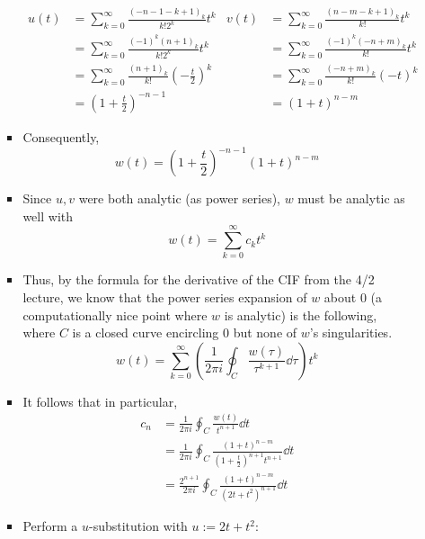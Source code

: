 \documentclass[../finalProject.tex]{subfiles}
\begin{document}
\begin{itemize}
\begin{itemize}
\begin{itemize}
            \begin{align*}
                u(t) &= \sum_{k=0}^\infty\frac{(-n-1-k+1)_k}{k!2^k}t^k&
                    v(t) &= \sum_{k=0}^\infty\frac{(n-m-k+1)_k}{k!}t^k\\
                &= \sum_{k=0}^\infty\frac{(-1)^k(n+1)_k}{k!2^k}t^k&
                    &= \sum_{k=0}^\infty\frac{(-1)^k(-n+m)_k}{k!}t^k\tag*{Identity 2}\\
                &= \sum_{k=0}^\infty\frac{(n+1)_k}{k!}(-\tfrac{t}{2})^k&
                    &= \sum_{k=0}^\infty\frac{(-n+m)_k}{k!}(-t)^k\\
                &= \left( 1+\frac{t}{2} \right)^{-n-1}&
                    &= (1+t)^{n-m}
            \end{align*}
            \item Consequently,
            \begin{equation*}
                w(t) = \left( 1+\frac{t}{2} \right)^{-n-1}(1+t)^{n-m}
            \end{equation*}
            \item Since $u,v$ were both analytic (as power series), $w$ must be analytic as well with
            \begin{equation*}
                w(t) = \sum_{k=0}^\infty c_kt^k
            \end{equation*}
            \item Thus, by the formula for the derivative of the CIF from the 4/2 lecture, we know that the power series expansion of $w$ about 0 (a computationally nice point where $w$ is analytic) is the following, where $C$ is a closed curve encircling 0 but none of $w$'s singularities.
            \begin{equation*}
                w(t) = \sum_{k=0}^\infty\left( \frac{1}{2\pi i}\oint_C\frac{w(\tau)}{\tau^{k+1}}\dd\tau \right)t^k
            \end{equation*}
            \item It follows that in particular,
            \begin{align*}
                c_n &= \frac{1}{2\pi i}\oint_C\frac{w(t)}{t^{n+1}}\dd{t}\\
                &= \frac{1}{2\pi i}\oint_C\frac{(1+t)^{n-m}}{\left( 1+\tfrac{t}{2} \right)^{n+1}t^{n+1}}\dd{t}\\
                &= \frac{2^{n+1}}{2\pi i}\oint_C\frac{(1+t)^{n-m}}{(2t+t^2)^{n+1}}\dd{t}
            \end{align*}
            \item Perform a $u$-substitution with $u:=2t+t^2$:

\end{itemize}
\end{itemize}
\end{itemize}
\end{document}
